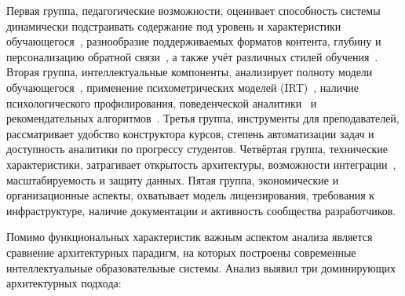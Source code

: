 Первая группа, педагогические возможности, оценивает
способность системы динамически подстраивать содержание под
уровень и характеристики обучающегося~\cite{brusilovsky2001adaptive},
разнообразие поддерживаемых форматов контента, глубину и
персонализацию обратной связи~\cite{woolf2009building}, а также
учёт различных стилей обучения~\cite{graf2007adaptive}. Вторая
группа, интеллектуальные компоненты, анализирует
полноту модели обучающегося~\cite{brusilovsky2007usermodels},
применение психометрических моделей (IRT)~\cite{vanlehn2006behavior},
наличие психологического профилирования, поведенческой
аналитики~\cite{ifenthaler2020learning} и рекомендательных
алгоритмов~\cite{conati2002bayesian}. Третья группа,
инструменты для преподавателей, рассматривает удобство
конструктора курсов, степень автоматизации задач и доступность
аналитики по прогрессу студентов. Четвёртая группа,
технические характеристики, затрагивает открытость
архитектуры, возможности интеграции~\cite{gamma1994design},
масштабируемость и защиту данных. Пятая группа,
экономические и организационные аспекты, охватывает
модель лицензирования, требования к инфраструктуре, наличие
документации и активность сообщества разработчиков.

Помимо функциональных характеристик важным аспектом анализа является 
сравнение архитектурных парадигм, на которых построены современные интеллектуальные 
образовательные системы. Анализ выявил три доминирующих архитектурных подхода:

